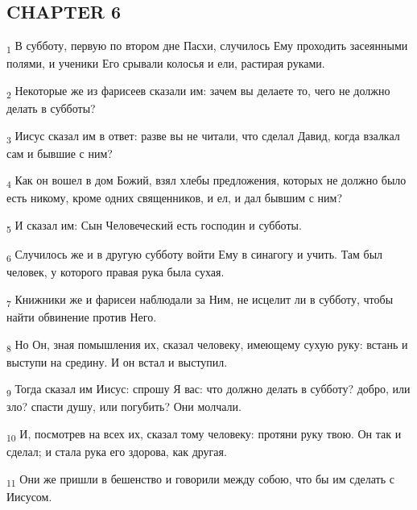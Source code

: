 \subsection{CHAPTER 6}
\begin{tcolorbox}
\textsubscript{1} В субботу, первую по втором дне Пасхи, случилось Ему проходить засеянными полями, и ученики Его срывали колосья и ели, растирая руками.
\end{tcolorbox}
\begin{tcolorbox}
\textsubscript{2} Некоторые же из фарисеев сказали им: зачем вы делаете то, чего не должно делать в субботы?
\end{tcolorbox}
\begin{tcolorbox}
\textsubscript{3} Иисус сказал им в ответ: разве вы не читали, что сделал Давид, когда взалкал сам и бывшие с ним?
\end{tcolorbox}
\begin{tcolorbox}
\textsubscript{4} Как он вошел в дом Божий, взял хлебы предложения, которых не должно было есть никому, кроме одних священников, и ел, и дал бывшим с ним?
\end{tcolorbox}
\begin{tcolorbox}
\textsubscript{5} И сказал им: Сын Человеческий есть господин и субботы.
\end{tcolorbox}
\begin{tcolorbox}
\textsubscript{6} Случилось же и в другую субботу войти Ему в синагогу и учить. Там был человек, у которого правая рука была сухая.
\end{tcolorbox}
\begin{tcolorbox}
\textsubscript{7} Книжники же и фарисеи наблюдали за Ним, не исцелит ли в субботу, чтобы найти обвинение против Него.
\end{tcolorbox}
\begin{tcolorbox}
\textsubscript{8} Но Он, зная помышления их, сказал человеку, имеющему сухую руку: встань и выступи на средину. И он встал и выступил.
\end{tcolorbox}
\begin{tcolorbox}
\textsubscript{9} Тогда сказал им Иисус: спрошу Я вас: что должно делать в субботу? добро, или зло? спасти душу, или погубить? Они молчали.
\end{tcolorbox}
\begin{tcolorbox}
\textsubscript{10} И, посмотрев на всех их, сказал тому человеку: протяни руку твою. Он так и сделал; и стала рука его здорова, как другая.
\end{tcolorbox}
\begin{tcolorbox}
\textsubscript{11} Они же пришли в бешенство и говорили между собою, что бы им сделать с Иисусом.
\end{tcolorbox}
